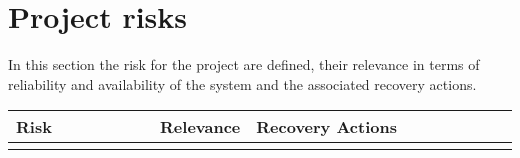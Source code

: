 \newpage
\section{Project risks}
In this section the risk for the project are defined, their relevance in terms of reliability and availability of the system and the associated recovery actions.
\begin{table}[H]
	\centering
	\begin{tabular}{|p{0.3\linewidth}|x{0.15\linewidth}|p{0.55\linewidth}|}
	\hline
	\textbf{Risk} & \textbf{Relevance} & \textbf{Recovery Actions} \\
	\hline
	& & \\
	\hline
	\end{tabular}
\end{table} 